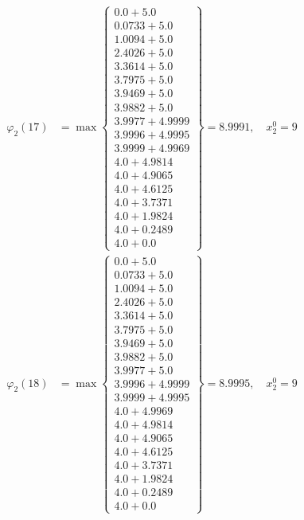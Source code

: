 \documentclass{article}
\begin{document}
\begin{align*}
  
\varphi_{2}(17) &= \max \left\{ \begin{array}{c}
0.0 + 5.0 \\
 0.0733 + 5.0 \\
 1.0094 + 5.0 \\
 2.4026 + 5.0 \\
 3.3614 + 5.0 \\
 3.7975 + 5.0 \\
 3.9469 + 5.0 \\
 3.9882 + 5.0 \\
 3.9977 + 4.9999 \\
 3.9996 + 4.9995 \\
 3.9999 + 4.9969 \\
 4.0 + 4.9814 \\
 4.0 + 4.9065 \\
 4.0 + 4.6125 \\
 4.0 + 3.7371 \\
 4.0 + 1.9824 \\
 4.0 + 0.2489 \\
 4.0 + 0.0
\end{array} \right\}=8.9991,\quad x_{2}^0=9\\
  
  
  
  
\varphi_{2}(18) &= \max \left\{ \begin{array}{c}
0.0 + 5.0 \\
 0.0733 + 5.0 \\
 1.0094 + 5.0 \\
 2.4026 + 5.0 \\
 3.3614 + 5.0 \\
 3.7975 + 5.0 \\
 3.9469 + 5.0 \\
 3.9882 + 5.0 \\
 3.9977 + 5.0 \\
 3.9996 + 4.9999 \\
 3.9999 + 4.9995 \\
 4.0 + 4.9969 \\
 4.0 + 4.9814 \\
 4.0 + 4.9065 \\
 4.0 + 4.6125 \\
 4.0 + 3.7371 \\
 4.0 + 1.9824 \\
 4.0 + 0.2489 \\
 4.0 + 0.0
\end{array} \right\}=8.9995,\quad x_{2}^0=9\\
  
  
  

\end{align*}
\end{document}
